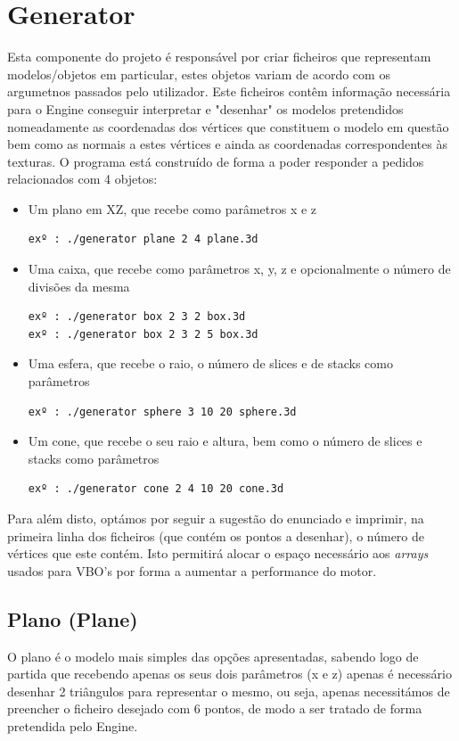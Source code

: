 \documentclass{article}
\begin{document}
\section{Generator}
Esta componente do projeto é responsável por criar ficheiros que representam modelos/objetos em particular, estes objetos variam de acordo com os argumetnos passados pelo utilizador. Este ficheiros contêm informação necessária para o Engine conseguir interpretar e "desenhar" os modelos pretendidos nomeadamente as coordenadas dos vértices que constituem o modelo em questão bem como as normais a estes vértices e ainda as coordenadas correspondentes às texturas. 
O programa está construído de forma a poder responder a pedidos relacionados com 4 objetos:
\begin{itemize}
    \item Um plano em XZ, que recebe como parâmetros x e z
        \begin{verbatim}
exº : ./generator plane 2 4 plane.3d
        \end{verbatim}
    \item Uma caixa, que recebe como parâmetros x, y, z e opcionalmente o número de divisões da mesma
        \begin{verbatim}
exº : ./generator box 2 3 2 box.3d
exº : ./generator box 2 3 2 5 box.3d
        \end{verbatim}
    \item Uma esfera, que recebe o raio, o número de slices e de stacks como parâmetros
        \begin{verbatim}
exº : ./generator sphere 3 10 20 sphere.3d
        \end{verbatim}
    \item Um cone, que recebe o seu raio e altura, bem como o número de slices e stacks como parâmetros
        \begin{verbatim}
exº : ./generator cone 2 4 10 20 cone.3d
        \end{verbatim}
\end{itemize}
Para além disto, optámos por seguir a sugestão do enunciado e imprimir, na primeira linha dos ficheiros (que contém os pontos a desenhar), o número de vértices que este contém. Isto permitirá alocar o espaço necessário aos \textit{arrays} usados para VBO's por forma a aumentar a performance do motor.

\subsection{Plano (Plane)}
O plano é o modelo mais simples das opções apresentadas, sabendo logo de partida que recebendo apenas os seus dois parâmetros (x e z) apenas é necessário desenhar 2 triângulos para representar o mesmo, ou seja, apenas necessitámos de preencher o ficheiro desejado com 6 pontos, de modo a ser tratado de forma pretendida pelo Engine.
\end{document}
